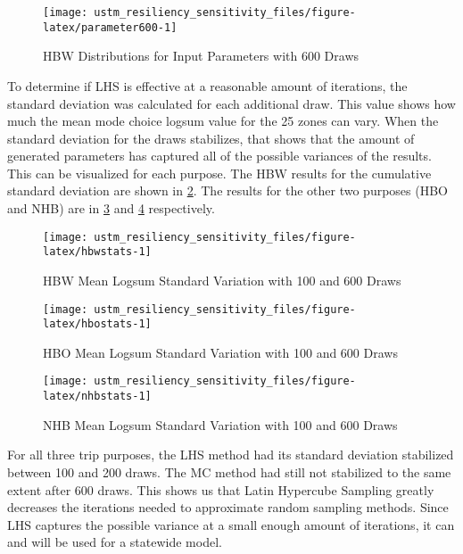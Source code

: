 \documentclass[3p, authoryear, review]{elsarticle} %
\begin{document}
\begin{figure}

{\centering \texttt{[image: ustm\_resiliency\_sensitivity\_files/figure-latex/parameter600-1]} 

}

\caption{HBW Distributions for Input Parameters with 600 Draws}\label{fig:parameter600}
\end{figure}

To determine if LHS is effective at a reasonable amount of iterations, the standard deviation was calculated for each additional draw. This value shows how much the mean mode choice logsum value for the 25 zones can vary. When the standard deviation for the draws stabilizes, that shows that the amount of generated parameters has captured all of the possible variances of the results. This can be visualized for each purpose. The HBW results for the cumulative standard deviation are shown in \ref{fig:hbwstats}. The results for the other two purposes (HBO and NHB) are in \ref{fig:hbostats} and \ref{fig:nhbstats} respectively.

\begin{figure}

{\centering \texttt{[image: ustm\_resiliency\_sensitivity\_files/figure-latex/hbwstats-1]} 

}

\caption{HBW Mean Logsum Standard Variation with 100 and 600 Draws}\label{fig:hbwstats}
\end{figure}

\begin{figure}

{\centering \texttt{[image: ustm\_resiliency\_sensitivity\_files/figure-latex/hbostats-1]} 

}

\caption{HBO Mean Logsum Standard Variation with 100 and 600 Draws}\label{fig:hbostats}
\end{figure}

\begin{figure}

{\centering \texttt{[image: ustm\_resiliency\_sensitivity\_files/figure-latex/nhbstats-1]} 

}

\caption{NHB Mean Logsum Standard Variation with 100 and 600 Draws}\label{fig:nhbstats}
\end{figure}

For all three trip purposes, the LHS method had its standard deviation stabilized between 100 and 200 draws. The MC method had still not stabilized to the same extent after 600 draws. This shows us that Latin Hypercube Sampling greatly decreases the iterations needed to approximate random sampling methods. Since LHS captures the possible variance at a small enough amount of iterations, it can and will be used for a statewide model.


\end{document}

